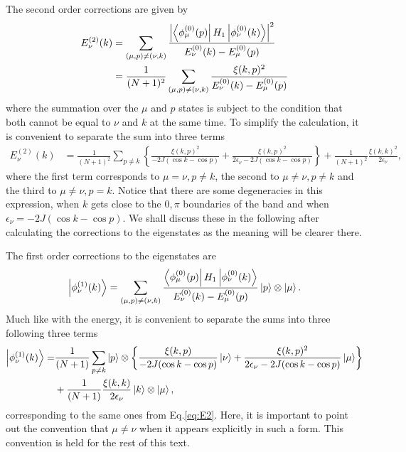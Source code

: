 \documentclass{article}
\begin{document}
The second order corrections are given by 
\begin{align}
    E_{\nu}^{(2)}(k) & = \sum_{(\mu,p)\neq(\nu,k)} \frac{\left|\bra{\phi^{(0)}_\mu (p)}H_1 \ket{\phi^{(0)}_\nu (k)}\right|^2}{ E_{\nu}^{(0)}(k) -  E_{\mu}^{(0)}(p)}\\
    & = \frac{1}{(N+1)^2}\sum_{(\mu,p)\neq(\nu,k)} \frac{ \xi(k,p)^2}{ E_{\nu}^{(0)}(k) -  E_{\mu}^{(0)}(p)}
\end{align}
where the summation over the $\mu$ and $p$ states is subject to the condition that 
both cannot be equal to $\nu$ and $k$ at the same time. To simplify the calculation,
 it is convenient to separate the sum into three terms
\begin{align}\label{eq:E2}
    E_{\nu}^{(2)}(k) & = \frac{1}{(N+1)^2}\sum_{p\neq k} \left \{ \frac{ \xi(k,p)^2}{ -2J( \cos k - \cos p ) } +  \frac{ \xi(k,p)^2}{ 2\epsilon_\nu -2J( \cos k - \cos p ) } \right \} + \frac{1}{(N+1)^2} \frac{\xi(k,k)^2}{2\epsilon_\nu},
\end{align}
where the first term corresponds to $\mu = \nu, p\neq k$, the second to $\mu \neq \nu, p\neq k$ and the third to $\mu \neq \nu, p = k$. Notice that there are some degeneracies in this expression, when $k$ gets close to the $0, \pi$  boundaries of the band and when $\epsilon_\nu = -2 J( \cos k -\cos p)$. We shall discuss these in the following after calculating the corrections to the eigenstates as the meaning will be clearer there. 

The first order corrections to the eigenstates are
\begin{align}
    \ket{\phi_\nu^{(1)} (k)} = \sum_{(\mu,p)\neq(\nu,k)} \frac{\bra{\phi^{(0)}_\mu (p)}H_1 \ket{\phi^{(0)}_\nu (k)}}{ E_{\nu}^{(0)}(k) -  E_{\mu}^{(0)}(p)} \ket{p}\otimes \ket{\mu}.
\end{align} 
Much like with the energy, it is convenient to separate the sums into three following three terms
\begin{align}\label{eq:psi_1}
    \ket{\phi_\nu^{(1)} (k)} = & \frac{1}{(N+1)}\sum_{p\neq k} \ket{p}\otimes \left \{ \frac{ \xi(k,p)}{ -2J( \cos k - \cos p ) } \ket{\nu} +  \frac{ \xi(k,p)^2}{ 2\epsilon_\nu -2J( \cos k - \cos p )} \ket{\mu} \right \} \nonumber \\ 
    & + \frac{1}{(N+1)} \frac{\xi(k,k)}{2\epsilon_\nu} \ket{k}\otimes\ket{\mu},
\end{align}
corresponding to the same ones from Eq.\eqref{eq:E2}. Here, it is important to point out the convention that $\mu \neq \nu$ when it appears explicitly in such a form. This convention is held for the rest of this text.
\end{document}
